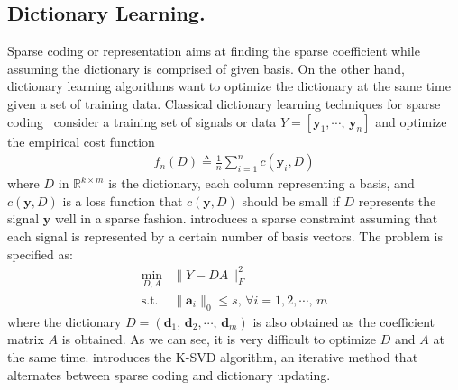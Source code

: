 \subsection{Dictionary Learning.}
Sparse coding or representation aims at finding the sparse coefficient while assuming the dictionary is comprised of given basis.
On the other hand, dictionary learning algorithms want to optimize the dictionary at the same time given a set of training data.
Classical dictionary learning techniques for sparse coding~\cite{olshausen1997sparse,engan1999frame} consider a training set of signals or data $Y=[\mathbf{y}_1,\cdots,\,\mathbf{y}_n]$ and optimize the empirical cost function
\begin{equation}
\begin{array}{cl}
f_n(D) \triangleq \frac{1}{n}\sum_{i=1}^n c(\mathbf{y}_i,D)
\end{array}
\end{equation}
where $D$ in $\mathbb{R}^{k\times m}$ is the dictionary, each column representing a basis, and $c(\mathbf{y},D)$ is a loss function that $c(\mathbf{y},D)$ should be small if $D$ represents the signal $\mathbf{y}$ well in a sparse fashion.
\cite{aharon2006svd} introduces a sparse constraint assuming that each signal is represented by a certain number of basis vectors.
The problem is specified as:
\begin{equation}
\label{eq-diclearning}
\begin{array}{cl}
\min_{D,A} & \|Y-DA\|_F^2\\
\mathrm{s.t.} & \|\mathbf{a}_i\|_0 \leq s,\,\forall i=1,2,\cdots,\,m
\end{array}
\end{equation}
where the dictionary $D=(\mathbf{d}_1,\,\mathbf{d}_2,\cdots ,\,\mathbf{d}_m)$ is also obtained as the coefficient matrix $A$ is obtained.
As we can see, it is very difficult to optimize $D$ and $A$ at the same time.
\cite{aharon2006svd} introduces the K-SVD algorithm, an iterative method that alternates between sparse coding and dictionary updating.



